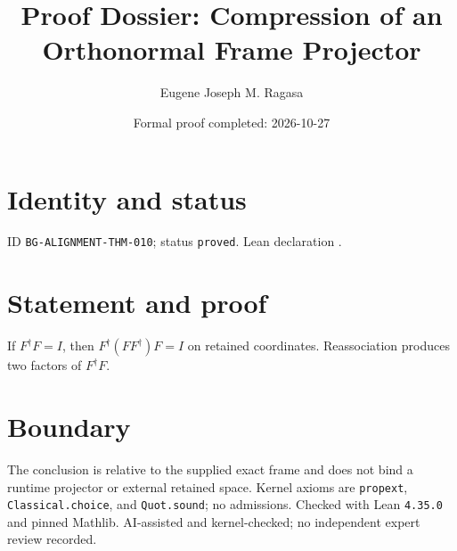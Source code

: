 \documentclass[11pt]{article}
\title{Proof Dossier: Compression of an Orthonormal Frame Projector}\author{Eugene Joseph M. Ragasa}\date{Formal proof completed: 2026-10-27}
\begin{document}
\maketitle
\section{Identity and status}
ID \texttt{BG-ALIGNMENT-THM-010}; status \texttt{proved}. Lean declaration .
\section{Statement and proof}
If $F^\dagger F=I$, then $F^\dagger(FF^\dagger)F=I$ on retained coordinates. Reassociation produces two factors of $F^\dagger F$.
\section{Boundary}
The conclusion is relative to the supplied exact frame and does not bind a runtime projector or external retained space. Kernel axioms are \texttt{propext}, \texttt{Classical.choice}, and \texttt{Quot.sound}; no admissions. Checked with Lean \texttt{4.35.0} and pinned Mathlib. AI-assisted and kernel-checked; no independent expert review recorded.
\end{document}
